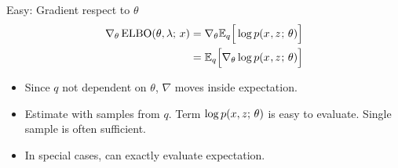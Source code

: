 \begin{frame}
Easy: Gradient respect to $\theta$
\begin{align*}
\nabla_{\theta} \operatorname*{ELBO}(\theta, \lambda ; \, x) &=  \nabla_\theta \mathbb{E}_{ q}\Big[ \log p(x^{}, z^{} ; \, \theta) \Big] \\
&= \mathbb{E}_{q}\Big[\nabla_{\theta} \log p(x^{}, z^{} ; \, \theta) \Big] 
\end{align*}\pause
\begin{itemize}
    \item Since $q$ not dependent on $\theta$, $\nabla$ moves inside expectation.
    \item Estimate with samples from $q$. Term $\log p(x, z ; \, \theta)$ is easy to evaluate. Single sample is often sufficient. 
    \item In special cases, can exactly evaluate expectation.
\end{itemize}
\end{frame}




